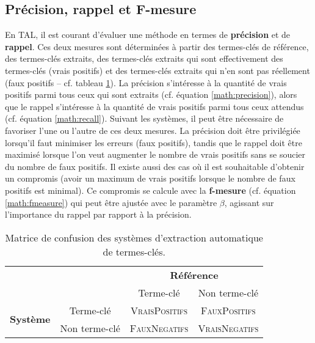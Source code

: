       \subsection{Précision, rappel et F-mesure}
      \label{subsec:main-state_of_the_art-automatic_evaluation_of_keyphrase_annotation-evaluation-evaluation_measures-precision_recall_and_f_measure}
        En TAL, il est courant d'évaluer une méthode en termes de
        \textbf{précision} et de \textbf{rappel}. Ces deux mesures sont
        déterminées à partir des termes-clés de référence, des termes-clés
        extraits, des termes-clés extraits qui sont effectivement des
        termes-clés (vrais positifs) et des termes-clés extraits qui n'en sont
        pas réellement (faux positifs -- cf. tableau \ref{tab:confusionmatrix}).
        La précision s'intéresse à la quantité de vrais positifs parmi tous ceux
        qui sont extraits (cf. équation \ref{math:precision}), alors que le
        rappel s'intéresse à la quantité de vrais positifs parmi tous ceux
        attendus (cf. équation \ref{math:recall}). Suivant les systèmes, il peut
        être nécessaire de favoriser l'une ou l'autre de ces deux mesures. La
        précision doit être privilégiée lorsqu'il faut minimiser les erreurs
        (faux positifs), tandis que le rappel doit être maximisé lorsque l'on
        veut augmenter le nombre de vrais positifs sans se soucier du nombre de
        faux positifs. Il existe aussi des cas où il est souhaitable d'obtenir
        un compromis (avoir un maximum de vrais positifs lorsque le nombre de
        faux positifs est minimal). Ce compromis se calcule avec la
        \textbf{f-mesure} (cf. équation \ref{math:fmeasure}) qui peut être
        ajustée avec le paramètre $\beta$, agissant sur l'importance du rappel
        par rapport à la précision.
        \begin{table}
          \begin{center}
            \begin{tabular}{|c|c|c|c|}
              \cline{3-4}
              \multicolumn{2}{c|}{} & \multicolumn{2}{|c|}{\textbf{Référence}}\\
              \cline{3-4}
              \multicolumn{2}{c|}{} & Terme-clé & Non terme-clé\\
              \hline
              \multirow{2}{*}{\textbf{Système}} & Terme-clé & \textsc{VraisPositifs} & \textsc{FauxPositifs}\\
              \cline{2-4}
              & Non terme-clé & \textsc{FauxNegatifs} & \textsc{VraisNegatifs}\\
              \hline
            \end{tabular}
            \caption{Matrice de confusion des systèmes d'extraction automatique de
                     termes-clés. \label{tab:confusionmatrix}}
          \end{center}
        \end{table}
